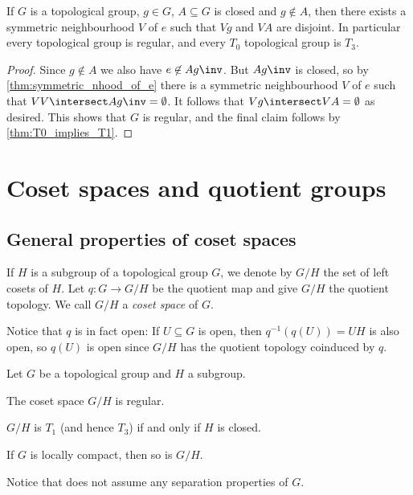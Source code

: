 \documentclass[article, a4paper, 11pt, oneside]{memoir}
\numberwithin{equation}{chapter}
\newcommand{\preim}{^{-1}}
\begin{document}
\begin{proposition}
    \label{thm:topological_group_regular}
    If $G$ is a topological group, $g \in G$, $A \subseteq G$ is closed and $g \not\in A$, then there exists a symmetric neighbourhood $V$ of $e$ such that $Vg$ and $VA$ are disjoint. In particular every topological group is regular, and every $T_0$ topological group is $T_3$.
\end{proposition}

\begin{proof}
    Since $g \not\in A$ we also have $e \not\in Ag\inv$. But $Ag\inv$ is closed, so by \cref{thm:symmetric_nhood_of_e} there is a symmetric neighbourhood $V$ of $e$ such that $VV \intersect Ag\inv = \emptyset$. It follows that $Vg \intersect VA = \emptyset$ as desired. This shows that $G$ is regular, and the final claim follows by \cref{thm:T0_implies_T1}.
\end{proof}


\chapter{Coset spaces and quotient groups}

\section{General properties of coset spaces}

If $H$ is a subgroup of a topological group $G$, we denote by $G/H$ the set of left cosets of $H$. Let $q \colon G \to G/H$ be the quotient map and give $G/H$ the quotient topology. We call $G/H$ a \emph{coset space} of $G$.

Notice that $q$ is in fact open: If $U \subseteq G$ is open, then $q\preim(q(U)) = UH$ is also open, so $q(U)$ is open since $G/H$ has the quotient topology coinduced by $q$.


\begin{proposition}
    Let $G$ be a topological group and $H$ a subgroup.
    \begin{enumprop}
        \item \label{enum:coset_space_regular} The coset space $G/H$ is regular.
        
        \item \label{enum:coset_space_T1} $G/H$ is $T_1$ (and hence $T_3$) if and only if $H$ is closed.
        
        \item \label{enum:coset_space_locally_compact} If $G$ is locally compact\footnotemark, then so is $G/H$.
    \end{enumprop}
\end{proposition}
%
Notice that  does not assume any separation properties of $G$.
\end{document}
